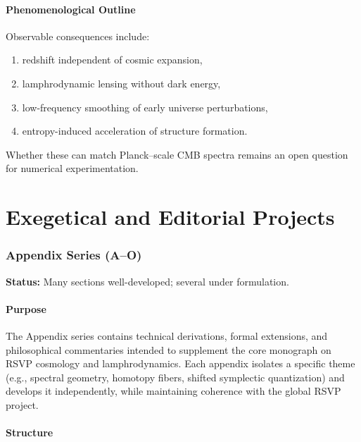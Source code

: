 \documentclass[12pt]{article}
\theoremstyle{plain}
\theoremstyle{definition}
\theoremstyle{remark}
\begin{document}
\subsection{Phenomenological Outline}

Observable consequences include:
\begin{enumerate}
    \item redshift independent of cosmic expansion,
    \item lamphrodynamic lensing without dark energy,
    \item low-frequency smoothing of early universe perturbations,
    \item entropy-induced acceleration of structure formation.
\end{enumerate}

Whether these can match Planck--scale CMB spectra remains an open question for
numerical experimentation.


\newpage

\part{Exegetical and Editorial Projects}


\section{Appendix Series (A--O)}

\textbf{Status:} Many sections well-developed; several under formulation.

\subsection{Purpose}

The Appendix series contains technical derivations, formal extensions, and
philosophical commentaries intended to supplement the core monograph on
RSVP cosmology and lamphrodynamics. Each appendix isolates a specific theme
(e.g., spectral geometry, homotopy fibers, shifted symplectic quantization)
and develops it independently, while maintaining coherence with the global
RSVP project.


\subsection{Structure}
\end{document}
